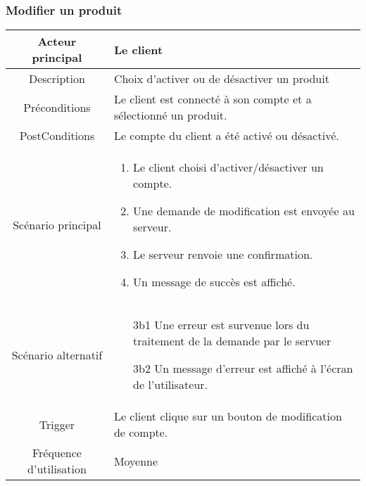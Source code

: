\documentclass{article}
\begin{document}
\subsubsection{Modifier un produit}
\begin{table}[h]
      \begin{tabular}{|c|p{10cm}|}
         \hline
         Acteur principal&Le client\\
         \hline
         Description&Choix d'activer ou de désactiver un produit\\
         \hline
         Préconditions&Le client est connecté à son compte et a sélectionné un produit.\\
         \hline
         PostConditions&Le compte du client a été activé ou désactivé.\\
         \hline
         Scénario principal& 
               \begin{enumerate}
                  \item Le client choisi d'activer/désactiver un compte.
                  \item Une demande de modification est envoyée au serveur.
                  \item Le serveur renvoie une confirmation.
                  \item Un message de succès est affiché.
               \end{enumerate}     \\
         \hline
         Scénario alternatif&
               \begin{itemize}
                  \item[3b1] Une erreur est survenue lors du traitement de la demande par le servuer
                  \item[3b2] Un message d'erreur est affiché à l'écran de l'utilisateur.  
               \end{itemize}\\
         \hline
         Trigger&Le client clique sur un bouton de modification de compte.\\
         \hline
         Fréquence d'utilisation&Moyenne\\
         \hline
      \end{tabular}
\end{table}

\newpage
\end{document}
